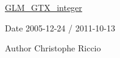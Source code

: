 \hyperlink{group__gtx__integer}{G\+L\+M\+\_\+\+G\+T\+X\+\_\+integer}

\begin{DoxyDate}{Date}
2005-\/12-\/24 / 2011-\/10-\/13 
\end{DoxyDate}
\begin{DoxyAuthor}{Author}
Christophe Riccio 
\end{DoxyAuthor}
